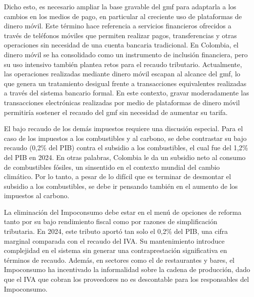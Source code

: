Dicho esto, es necesario ampliar la base gravable del \gls{gmf} para adaptarla a los cambios en los medios de pago, en particular al creciente uso de plataformas de dinero móvil. Este término hace referencia a servicios financieros ofrecidos a través de teléfonos móviles que permiten realizar pagos, transferencias y otras operaciones sin necesidad de una cuenta bancaria tradicional. En Colombia, el dinero móvil se ha consolidado como un instrumento de inclusión financiera, pero su uso intensivo también plantea retos para el recaudo tributario. Actualmente, las operaciones realizadas mediante dinero móvil escapan al alcance del \gls{gmf}, lo que genera un tratamiento desigual frente a transacciones equivalentes realizadas a través del sistema bancario formal. En este contexto, gravar moderadamente las transacciones electrónicas realizadas por medio de plataformas de dinero móvil permitiría sostener el recaudo del \gls{gmf} sin necesidad de aumentar su tarifa.

El bajo recaudo de los demás impuestos requiere una discusión especial. Para el caso de los impuestos a los combustibles y al carbono, se debe contrastar su bajo recaudo (0,2\% del PIB) contra el subsidio a los combustibles, el cual fue del 1,2\% del PIB en 2024. En otras palabras, Colombia le da un subsidio neto al consumo de combustibles fósiles, un sinsentido en el contexto mundial del cambio climático. Por lo tanto, a pesar de lo difícil que es terminar de desmontar el subsidio a los combustibles, se debe ir pensando también en el aumento de los impuestos al carbono.

La eliminación del Impoconsumo debe estar en el menú de opciones de reforma tanto por su bajo rendimiento fiscal como por razones de simplificación tributaria. En 2024, este tributo aportó tan solo el 0,2\% del PIB, una cifra marginal comparada con el recaudo del IVA. Su mantenimiento introduce complejidad en el sistema sin generar una contraprestación significativa en términos de recaudo. Además, en sectores como el de restaurantes y bares, el Impoconsumo ha incentivado la informalidad sobre la cadena de producción, dado que el IVA que cobran los proveedores no es descontable para los responsables del Impoconsumo. %


